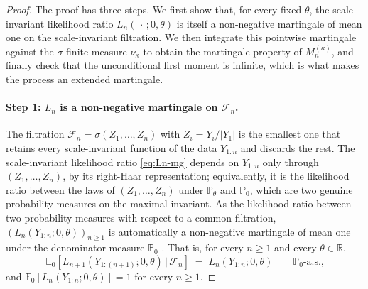 \documentclass[12pt, a4paper]{report}
\newcommand{\1}{\mathbf{1}}
\begin{document}
\begin{proof}
The proof has three steps. We first show that, for every fixed $\theta$,
the scale-invariant likelihood ratio $L_n(\,\cdot\,;0,\theta)$ is itself a
non-negative martingale of mean one on the scale-invariant filtration. We then
integrate this pointwise martingale against the $\sigma$-finite measure
$\nu_\kappa$ to obtain the martingale property of $M_n^{(\kappa)}$, and finally
check that the unconditional first moment is infinite, which is what makes the process an extended martingale.

\paragraph{Step 1: $L_n$ is a non-negative martingale on $\mathcal{F}_n$.}
The filtration $\mathcal{F}_n = \sigma(Z_1,\dots,Z_n)$ with $Z_i = Y_i/|Y_1|$
is the smallest one that retains every scale-invariant function of the data
$Y_{1:n}$ and discards the rest. The scale-invariant likelihood ratio
\eqref{eq:Ln-mg} depends on $Y_{1:n}$ only through $(Z_1,\dots,Z_n)$, by its
right-Haar representation; equivalently, it is the likelihood ratio between
the laws of $(Z_1,\dots,Z_n)$ under $\mathbb{P}_\theta$ and $\mathbb{P}_0$,
which are two genuine probability measures on the maximal invariant. As the
likelihood ratio between two probability measures with respect to a common
filtration, $(L_n(Y_{1:n};0,\theta))_{n\geq 1}$ is automatically a non-negative
martingale of mean one under the denominator measure $\mathbb{P}_0$
\citep[Cor.~4.6]{Wang2025}. That is, for every $n\geq 1$ and every
$\theta\in\mathbb{R}$,
\begin{equation}\label{eq:Ln-mg}
   \mathbb{E}_0\!\left[L_{n+1}(Y_{1:(n+1)};0,\theta)\,\big|\,\mathcal{F}_n\right]
   \;=\; L_n(Y_{1:n};0,\theta)
   \qquad\mathbb{P}_0\text{-a.s.,}
\end{equation}
and $\mathbb{E}_0[L_n(Y_{1:n};0,\theta)] = 1$ for every $n\geq 1$.


\end{proof}
\end{document}
